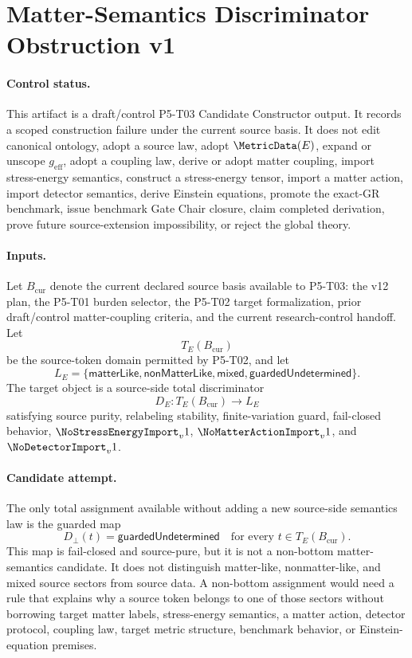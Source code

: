\section*{Matter-Semantics Discriminator Obstruction v1}

\paragraph{Control status.}
This artifact is a draft/control P5-T03 Candidate Constructor output.  It
records a scoped construction failure under the current source basis.  It does
not edit canonical ontology, adopt a source law, adopt \(\MetricData(E)\),
expand or unscope \(g_{\mathrm{eff}}\), adopt a coupling law, derive or adopt
matter coupling, import stress-energy semantics, construct a stress-energy
tensor, import a matter action, import detector semantics, derive Einstein
equations, promote the exact-GR benchmark, issue benchmark Gate Chair closure,
claim completed derivation, prove future source-extension impossibility, or
reject the global theory.

\paragraph{Inputs.}
Let \(B_{\mathrm{cur}}\) denote the current declared source basis available to
P5-T03: the v12 plan, the P5-T01 burden selector, the P5-T02 target
formalization, prior draft/control matter-coupling criteria, and the current
research-control handoff.  Let
\[
  T_E(B_{\mathrm{cur}})
\]
be the source-token domain permitted by P5-T02, and let
\[
  L_E=\{\mathsf{matterLike},\mathsf{nonMatterLike},
        \mathsf{mixed},\mathsf{guardedUndetermined}\}.
\]
The target object is a source-side total discriminator
\[
  D_E:T_E(B_{\mathrm{cur}})\to L_E
\]
satisfying source purity, relabeling stability, finite-variation guard,
fail-closed behavior, \(\NoStressEnergyImport_v1\),
\(\NoMatterActionImport_v1\), and \(\NoDetectorImport_v1\).

\paragraph{Candidate attempt.}
The only total assignment available without adding a new source-side semantics
law is the guarded map
\[
  D_{\bot}(t)=\mathsf{guardedUndetermined}
  \quad\text{for every }t\in T_E(B_{\mathrm{cur}}).
\]
This map is fail-closed and source-pure, but it is not a non-bottom
matter-semantics candidate.  It does not distinguish matter-like,
nonmatter-like, and mixed source sectors from source data.  A non-bottom
assignment would need a rule that explains why a source token belongs to one
of those sectors without borrowing target matter labels, stress-energy
semantics, a matter action, detector protocol, coupling law, target metric
structure, benchmark behavior, or Einstein-equation premises.

